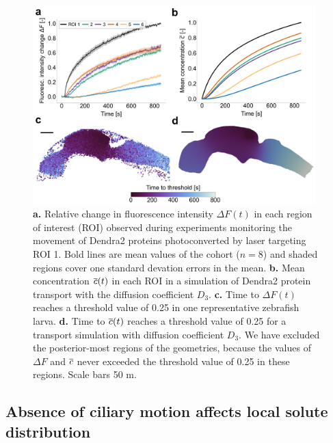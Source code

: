 \documentclass{WileyMSP-template}
\begin{document}
\begin{figure}[H]
    \centering
    \includegraphics[width=0.975\textwidth]{graphics/figure3_compare_experiments_and_simulations.png}
    \caption{
    \textbf{a.} Relative change in fluorescence intensity $\Delta F(t)$ 
    in each region of interest (ROI)
    observed during experiments monitoring
    the movement of Dendra2 proteins photoconverted by laser targeting ROI 1. 
    Bold lines are mean values of the cohort ($n=8$) and shaded regions cover
    one standard devation errors in the mean.
    \textbf{b.} Mean concentration $\overline{c}(t)$ in each ROI in a
    simulation of Dendra2 protein transport with
    the diffusion coefficient $D_3$.
    \textbf{c.} Time to $\Delta F(t)$ reaches a threshold value of 0.25 in
    one representative zebrafish larva.
    \textbf{d.} Time to $\overline{c}(t)$ reaches a threshold value of 0.25 for
    a transport simulation with diffusion coefficient $D_3$.
    We have excluded the posterior-most regions of the geometries,
    because the values of $\Delta F$ and $\overline{c}$ never exceeded the threshold
    value of 0.25 in these regions. Scale bars 50 \textmu m.}
    \label{fig:fig3}
\end{figure}

\subsection{Absence of ciliary motion affects local solute distribution}
\end{document}
